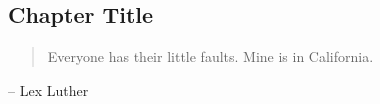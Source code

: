 \documentclass[11pt, final]{ucthesis}
\begin{document}
\begin{dissertationText}
\renewcommand{\baselinestretch}{1.66}

\chapter{Chapter Title}

\begin{quote}
Everyone has their little faults. Mine is in California.
\end{quote}
\begin{flushright}
-- Lex Luther
\end{flushright}

    

\clearpage




\end{dissertationText}
\end{document}
